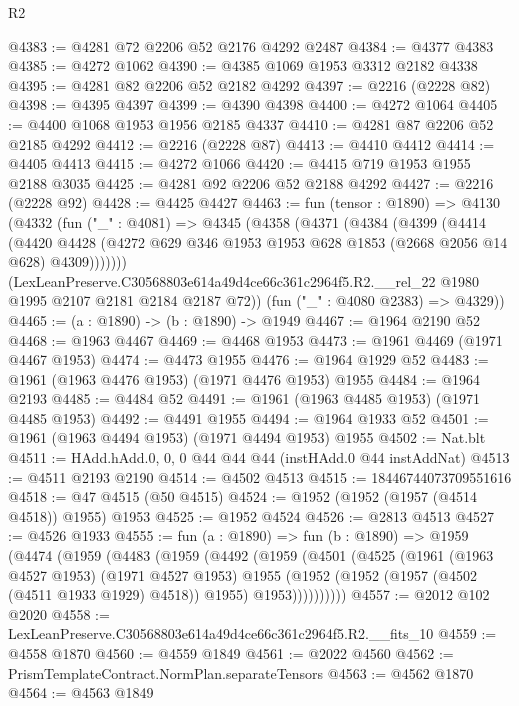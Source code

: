\begin{lexlean}{R2}
\begin{coremodule}
@4383 := @4281 @72 @2206 @52 @2176 @4292 @2487
@4384 := @4377 @4383
@4385 := @4272 @1062
@4390 := @4385 @1069 @1953 @3312 @2182 @4338
@4395 := @4281 @82 @2206 @52 @2182 @4292
@4397 := @2216 (@2228 @82)
@4398 := @4395 @4397
@4399 := @4390 @4398
@4400 := @4272 @1064
@4405 := @4400 @1068 @1953 @1956 @2185 @4337
@4410 := @4281 @87 @2206 @52 @2185 @4292
@4412 := @2216 (@2228 @87)
@4413 := @4410 @4412
@4414 := @4405 @4413
@4415 := @4272 @1066
@4420 := @4415 @719 @1953 @1955 @2188 @3035
@4425 := @4281 @92 @2206 @52 @2188 @4292
@4427 := @2216 (@2228 @92)
@4428 := @4425 @4427
@4463 := fun (tensor : @1890) =>
  @4130
    (@4332
      (fun ("_" : @4081) =>
      @4345
        (@4358
          (@4371
            (@4384
              (@4399
                (@4414
                  (@4420
                    @4428
                    (@4272 @629 @346 @1953 @1953 @628 @1853 (@2668 @2056 @14 @628) @4309)))))))
        (LexLeanPreserve.C30568803e614a49d4ce66c361c2964f5.R2.__rel_22
          @1980
          @1995
          @2107
          @2181
          @2184
          @2187
          @72))
      (fun ("_" : @4080 @2383) => @4329))
@4465 := (a : @1890) -> (b : @1890) -> @1949
@4467 := @1964 @2190 @52
@4468 := @1963 @4467
@4469 := @4468 @1953
@4473 := @1961 @4469 (@1971 @4467 @1953)
@4474 := @4473 @1955
@4476 := @1964 @1929 @52
@4483 := @1961 (@1963 @4476 @1953) (@1971 @4476 @1953) @1955
@4484 := @1964 @2193
@4485 := @4484 @52
@4491 := @1961 (@1963 @4485 @1953) (@1971 @4485 @1953)
@4492 := @4491 @1955
@4494 := @1964 @1933 @52
@4501 := @1961 (@1963 @4494 @1953) (@1971 @4494 @1953) @1955
@4502 := Nat.blt
@4511 := HAdd.hAdd.{0, 0, 0} @44 @44 @44 (instHAdd.{0} @44 instAddNat)
@4513 := @4511 @2193 @2190
@4514 := @4502 @4513
@4515 := 18446744073709551616
@4518 := @47 @4515 (@50 @4515)
@4524 := @1952 (@1952 (@1957 (@4514 @4518)) @1955) @1953
@4525 := @1952 @4524
@4526 := @2813 @4513
@4527 := @4526 @1933
@4555 := fun (a : @1890) =>
  fun (b : @1890) =>
  @1959
    (@4474
      (@1959
        (@4483
          (@1959
            (@4492
              (@1959
                (@4501
                  (@4525
                    (@1961
                      (@1963 @4527 @1953)
                      (@1971 @4527 @1953)
                      @1955
                      (@1952 (@1952 (@1957 (@4502 (@4511 @1933 @1929) @4518)) @1955) @1953))))))))))
@4557 := @2012 @102 @2020
@4558 := LexLeanPreserve.C30568803e614a49d4ce66c361c2964f5.R2.__fits_10
@4559 := @4558 @1870
@4560 := @4559 @1849
@4561 := @2022 @4560
@4562 := PrismTemplateContract.NormPlan.separateTensors
@4563 := @4562 @1870
@4564 := @4563 @1849

\end{coremodule}
\end{lexlean}
